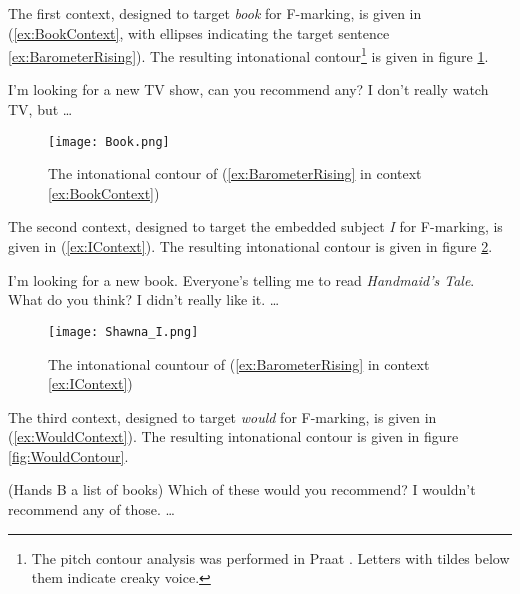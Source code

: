\documentclass[
	letterpaper,
]{article}
\begin{document}
The first context, designed to target \textit{book} for F-marking, is given in (\ref{ex:BookContext}, with ellipses indicating the target sentence \ref{ex:BarometerRising}).
The resulting intonational contour\footnote{
	The pitch contour analysis was performed in Praat \parencite{praat}.
	Letters with tildes below them indicate creaky voice.
} is given in figure \ref{fig:BookContour}.
\begin{exe}
\ex\label{ex:BookContext}
\begin{xlist}
	 I'm looking for a new TV show, can you recommend any?
	 I don't really watch TV, but \dots
\end{xlist}
\end{exe}
\begin{figure}[h]
	\centering
	\texttt{[image: Book.png]}
	\caption{The intonational contour of (\ref{ex:BarometerRising} in context \ref{ex:BookContext})}
	\label{fig:BookContour}
\end{figure}
\FloatBarrier
The second context, designed to target the embedded subject \textit{I} for F-marking, is given in (\ref{ex:IContext}).
The resulting intonational contour is given in figure \ref{fig:IContour}.
\begin{exe}
\ex\label{ex:IContext}
\begin{xlist}
	 I'm looking for a new book. Everyone's telling me to read \textit{Handmaid's Tale}. What do you think?
	 I didn't really like it. \dots
\end{xlist}	
\end{exe}

\begin{figure}[h]
	\centering
	\texttt{[image: Shawna\_I.png]}
	\caption{The intonational countour of (\ref{ex:BarometerRising} in context \ref{ex:IContext})}
	\label{fig:IContour}
\end{figure}
\FloatBarrier
The third context, designed to target \textit{would} for F-marking, is given in (\ref{ex:WouldContext}).
The resulting intonational contour is given in figure \ref{fig:WouldContour}.
\begin{exe}
\ex\label{ex:WouldContext}
\begin{xlist}
	 (Hands B a list of books) Which of these would you recommend?
	 I wouldn't recommend any of those. \dots
\end{xlist}	
\end{exe}
\end{document}
